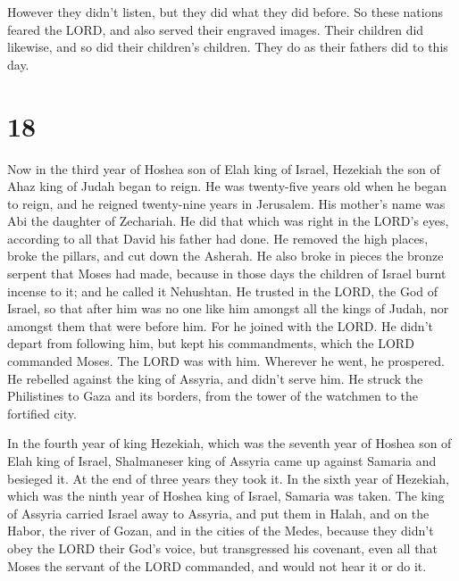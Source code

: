  However they didn't listen, but they did what they did
before.  So these nations feared the LORD, and also
served their engraved images. Their children did likewise, and so did
their children's children. They do as their fathers did to this day.

\hypertarget{section-17}{%
\section{18}\label{section-17}}

 Now in the third year of Hoshea son of Elah king of
Israel, Hezekiah the son of Ahaz king of Judah began to reign.
 He was twenty-five years old when he began to reign, and
he reigned twenty-nine years in Jerusalem. His mother's name was Abi the
daughter of Zechariah.  He did that which was right in the
LORD's eyes, according to all that David his father had done.
 He removed the high places, broke the pillars, and cut
down the Asherah. He also broke in pieces the bronze serpent that Moses
had made, because in those days the children of Israel burnt incense to
it; and he called it Nehushtan.  He trusted in the LORD,
the God of Israel, so that after him was no one like him amongst all the
kings of Judah, nor amongst them that were before him. 
For he joined with the LORD. He didn't depart from following him, but
kept his commandments, which the LORD commanded Moses. 
The LORD was with him. Wherever he went, he prospered. He rebelled
against the king of Assyria, and didn't serve him.  He
struck the Philistines to Gaza and its borders, from the tower of the
watchmen to the fortified city.

 In the fourth year of king Hezekiah, which was the
seventh year of Hoshea son of Elah king of Israel, Shalmaneser king of
Assyria came up against Samaria and besieged it.  At the
end of three years they took it. In the sixth year of Hezekiah, which
was the ninth year of Hoshea king of Israel, Samaria was taken.
 The king of Assyria carried Israel away to Assyria, and
put them in Halah, and on the Habor, the river of Gozan, and in the
cities of the Medes,  because they didn't obey the LORD
their God's voice, but transgressed his covenant, even all that Moses
the servant of the LORD commanded, and would not hear it or do it.

